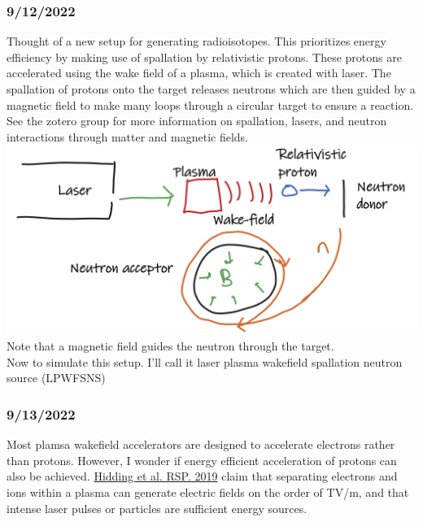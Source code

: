 \documentclass[12pt]{article}
\begin{document}
\subsubsection{9/12/2022}
Thought of a new setup for generating radioisotopes. This prioritizes energy efficiency by making use of spallation by relativistic protons. These protons are accelerated using the wake field of a plasma, which is created with laser. 
The spallation of protons onto the target releases neutrons which are then guided by a magnetic field to make many loops through a circular target to ensure a reaction. See the zotero group for more information on spallation, lasers, and neutron interactions through matter and magnetic fields. \\
\includegraphics[scale=.65]{Images/laser plasma accelerated spallation neutron generator concept.PNG}\\
Note that a magnetic field guides the neutron through the target. \\
Now to simulate this setup. I'll call it laser plasma wakefield spallation neutron source (LPWFSNS) 
\subsubsection{9/13/2022}
Most plamsa wakefield accelerators are designed to accelerate electrons rather than protons. However, I wonder if energy efficient acceleration of protons can also be achieved. \href{http://dx.doi.org/10.1098/rsta.2019.0215}{Hidding et al. RSP. 2019} claim that separating electrons and ions within a plasma can generate electric fields on the order of TV/m, and that intense laser pulses or particles are sufficient energy sources. 
\end{document}
